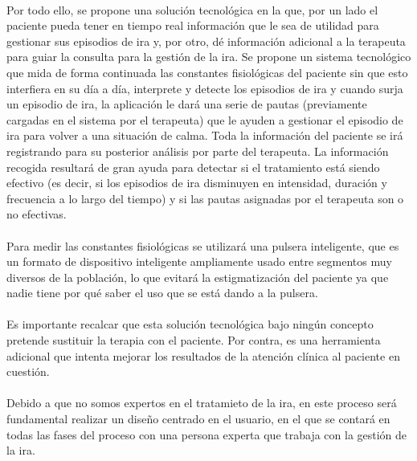 \paragraph{}
Por todo ello, se propone una solución tecnológica en la que, por un lado el paciente pueda tener en tiempo real información que le sea de utilidad para gestionar sus episodios de ira y, por otro, dé información adicional a la terapeuta para guiar la consulta para la gestión de la ira. Se propone un sistema tecnológico que mida de forma continuada las constantes fisiológicas del paciente sin que esto interfiera en su día a día, interprete y detecte los episodios de ira y cuando surja un episodio de ira, la aplicación le dará una serie de pautas (previamente cargadas en el sistema por el terapeuta) que le ayuden a gestionar el episodio de ira para volver a una situación de calma. Toda la información del paciente se irá registrando para su posterior análisis por parte del terapeuta. La información recogida resultará de gran ayuda para detectar si el tratamiento está siendo efectivo (es decir, si los episodios de ira disminuyen en intensidad, duración y frecuencia a lo largo del tiempo) y si las pautas asignadas por el terapeuta son o no efectivas.

\paragraph{}
Para medir las constantes fisiológicas se utilizará una pulsera inteligente, que es un formato de dispositivo inteligente ampliamente usado entre segmentos muy diversos de la población, lo que evitará la estigmatización del paciente ya que nadie tiene por qué saber el uso que se está dando a la pulsera.

\paragraph{}
Es importante recalcar que esta solución tecnológica bajo ningún concepto pretende sustituir la terapia con el paciente. Por contra, es una herramienta adicional que intenta mejorar los resultados de la atención clínica al paciente en cuestión.

\paragraph{}
Debido a que no somos expertos en el tratamieto de la ira, en este proceso será fundamental realizar un diseño centrado en el usuario, en el que se contará en todas las fases del proceso con una persona experta que trabaja con la gestión de la ira.

